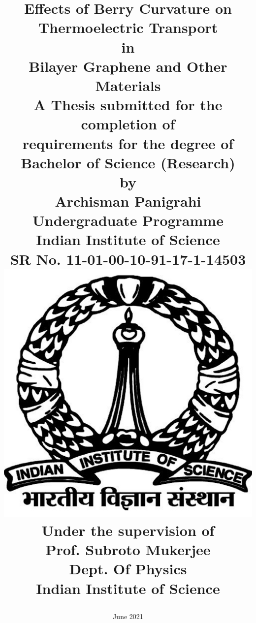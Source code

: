 \documentclass{report}
\begin{document}


%





\title{
	\sc
	\Huge{Effects of Berry Curvature on Thermoelectric Transport}\\
	\Large{in}\\
	\Huge{Bilayer Graphene and Other Materials}
	\\[30pt]
	\large{A Thesis submitted for the completion of}
	\\[5pt]
	\large{requirements for the degree of}
	\\[10pt]
	\Large{Bachelor of Science (Research)}
	\\[10pt]
	\normalsize{by}
	\\[10pt]
	\large{Archisman Panigrahi}
	\\[5pt]
	\normalsize{Undergraduate Programme}
	\\[5pt]
	\normalsize{Indian Institute of Science}
	\\[5pt]
	\normalsize{SR No.}
	\normalsize{11-01-00-10-91-17-1-14503}
	\\[10pt]
	\includegraphics[scale=0.12]{Logo.png}
	\\[10pt]
	\normalsize{Under the supervision of}
	\\[10pt]
	\large{Prof. Subroto Mukerjee}\\[5pt]
	\normalsize{Dept. Of Physics}\\[5pt]
	\normalsize{Indian Institute of Science}
	\date{June 2021}
}
\end{document}
